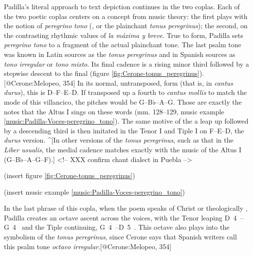 Padilla's literal approach to text depiction continues in the two coplas.
Each of the two poetic coplas centers on a concept from music theory: the first
plays with the notion of \emph{peregrino tono} (, or the plainchant
\emph{tonus peregrinus}); the second, on the contrasting rhythmic values of
\emph{la
máxima y breve}.
True to form, Padilla sets \emph{peregrino tono} to a fragment of the actual
plainchant tone.
The last psalm tone was known in Latin sources as the \emph{tonus peregrinus} and in
Spanish sources as \emph{tono irregular} or \emph{tono mixto}.
Its final cadence is a rising minor third followed by a stepwise descent to the
final (figure \ref{fig:Cerone-tonus_peregrinus}).
[@Cerone:Melopeo, 354]
In its normal, untransposed, form (that is, in \emph{cantus durus}), this is
D--F--E--D.
If transposed up a fourth to \emph{cantus mollis} to match the mode of this
villancico, the pitches would be G--B♭--A--G. 
Those are exactly the notes that the Altus I sings on these words (mm. 128--129,
music example \ref{music:Padilla-Voces-peregrino_tono}).
The same motive of the a leap up followed by a descending third is then imitated
in the Tenor I and Tiple I on F--E--D, the \emph{durus} version.
^[In other versions of the \emph{tonus peregrinus}, such as that in the \emph{Liber
usualis}, the medial cadence matches exactly with the music of the Altus I
(G--B♭--A--G--F).]
<!-- XXX confirm chant dialect in Puebla -->

(insert figure \ref{fig:Cerone-tonus_peregrinus})
\label{fig:Cerone-tonus_peregrinus}

(insert music example \ref{music:Padilla-Voces-peregrino_tono})
\label{music:Padilla-Voces-peregrino_tono}

In the last phrase of this copla, when the poem speaks of Christ  or theologically , Padilla creates an
octave ascent across the voices, with the Tenor leaping D~4~--G~4~ and the Tiple
continuing, G~4~--D~5~.
This octave also plays into the symbolism of the \emph{tonus peregrinus}, since
Cerone says that Spanish writers call this  psalm tone \emph{octavo
irregular}.[@Cerone:Melopeo, 354]

